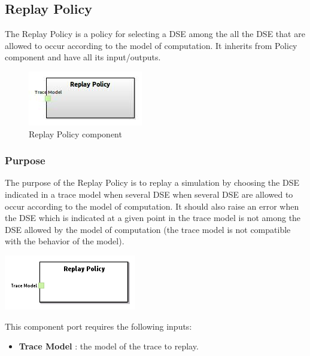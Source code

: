 \documentclass{gemoc} %
\begin{document}
\subsection{Replay Policy}
The Replay Policy is a policy for selecting a DSE among the all the DSE that are allowed to occur according to the model of computation.
It inherits from Policy component and have all its input/outputs.
\begin{figure}[htp]
	\begin{center}
	\includegraphics*[trim=0.0cm 0.0cm 0cm 0.0cm, clip=true, scale=1.0]{../images/generated/Generated_Replay Policy.jpg}
	\caption{Replay Policy component}
	\end{center}
\end{figure}

\subsubsection{Purpose}
The purpose of the Replay Policy is to replay a simulation by choosing the DSE indicated in a trace model when several DSE when several DSE are allowed to occur according to the model of computation. It should also raise an error when the DSE which is indicated at a given point in the trace model is not among the DSE allowed by the model of computation (the trace model is not compatible with the behavior of the model).
\begin{center}
\includegraphics*[trim=0.0cm 0.0cm 0cm 0.0cm, clip=true]{../images/generated/Generated_Replay_Policy.png}
\end{center}

This component port requires the following inputs:
\begin{itemize}
  \item \textbf{Trace Model} :
the model of the trace to replay.
\end{itemize}
\end{document}
